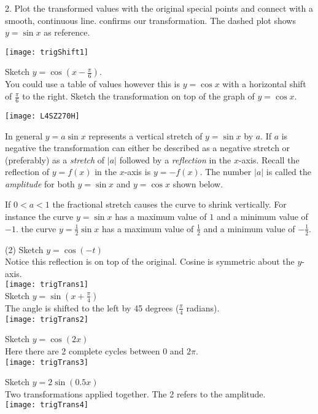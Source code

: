 2. Plot the transformed values with the original special points and connect with a smooth, continuous line. \Desmos confirms our transformation. The dashed plot shows $y=\sin x$ as reference.\\
\begin{center}
\texttt{[image: trigShift1]}
\end{center}


\example Sketch $y =\cos  (x -\frac{\pi }{6})$.\medskip\\
\solution You could use a table of values however this is $y =\cos  x$ with a horizontal shift of $\frac{\pi }{6}$ to the right. Sketch the transformation on top of the graph of $y =\cos  x $.
\begin{center}
\texttt{[image: L4SZ270H]}
\end{center}

In general $y =a \sin  x$ represents a vertical stretch of $y =\sin  x$ by $a$. If $a$ is negative the transformation can either be described as a negative stretch or (preferably) as a \emph{stretch}
of $\left \vert a\right \vert $ followed by a \emph{reflection} in the $x$-axis. Recall the reflection of $y =f \left (x\right )$ in the $x$-axis is $y = -f \left (x\right )$. The number $\left \vert a\right \vert $ is called the \emph{amplitude} for both $y =\sin  x$ and $y =\cos  x$ shown below. 

If $0 <a <1$ the fractional stretch causes the curve to shrink vertically. For instance the curve
$y =\sin  x$ has a maximum value of $1$ and a minimum value of $ -1$. the curve $y =\frac{1}{2} \sin  x$ has a maximum value of $\frac{1}{2}$ and a minimum value of $ -\frac{1}{2}$. 

\begin{tasks}(2)
\task\example Sketch $y =\cos  ( -t)$ \medskip\\
Notice this reflection is on top of the original. Cosine is symmetric about the $y$-axis.\\
\texttt{[image: trigTrans1]}\\

\task\example Sketch $y =\sin(x+\frac{\pi}{4})$\medskip\\
The angle is shifted to the left by 45 degrees ($\frac{\pi}{4}$ radians).\\
\texttt{[image: trigTrans2]}

\task\example Sketch $y =\cos(2x)$ \medskip\\
Here there are 2 complete cycles between 0 and $2\pi$.\\
\texttt{[image: trigTrans3]}

\task\example Sketch $y =2\sin(0.5x)$ \medskip\\
Two transformations applied together. The 2 refers to the amplitude.\\
\texttt{[image: trigTrans4]}
\end{tasks}

